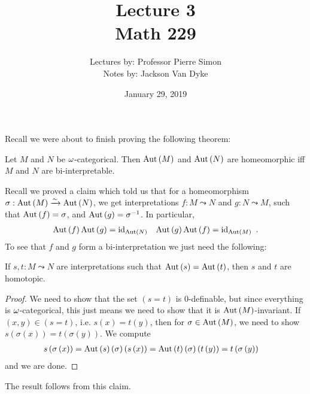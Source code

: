\documentclass{amsart}
\begin{document}
\title{Lecture 3\\Math 229}
\author{Lectures by: Professor Pierre Simon\\Notes by: Jackson Van Dyke}
\date{January 29, 2019}
\maketitle

Recall we were about to finish proving the following theorem:

\begin{thm}
Let $M$ and $N$ be $\omega$-categorical. 
Then $\operatorname{Aut}\left( M \right)$ and $\operatorname{Aut}\left( N \right)$
are homeomorphic iff $M$ and $N$ are bi-interpretable.
\end{thm}

\begin{Proof}
Recall we proved a claim which told us that for a homeomorphism
$\sigma : \operatorname{Aut}\left( M \right)\xrightarrow{\sim}\operatorname{Aut}\left( N \right)$,
we get interpretations $f: M\leadsto N$ and $g:N\leadsto M$,
such that $\operatorname{Aut}\left( f \right) = \sigma$, and $\operatorname{Aut}\left( g \right) = \sigma^{-1}$.
In particular, 
\begin{align}
\Aut\left( f \right) \Aut\left( g \right) = \id_{\Aut\left( N \right)} &&
\Aut\left( g \right) \Aut\left(f \right) = \id_{\Aut\left( M \right)} \ .
\end{align}
To see that $f$ and $g$ form a bi-interpretation we just need the following:
\begin{clm}
If $s,t:M\leadsto N$ are interpretations such that
$\operatorname{Aut}\left( s \right) = \operatorname{Aut}\left( t \right)$, then $s$ and $t$ are homotopic.
\end{clm}
\begin{proof}
We need to show that the set $\left( s=t \right)$ is $0$-definable,
but since everything is $\omega$-categorical,
this just means we need to show that it is $\operatorname{Aut}\left( M \right)$-invariant.
If $\left( x,y \right) \in \left( s=t \right)$, i.e.
$s\left( x \right) = t\left( y \right)$, 
then for $\sigma \in \operatorname{Aut}\left( M \right)$, we need to show 
$s\left( \sigma\left( x \right) \right) = t\left( \sigma\left( y \right) \right)$. 
We compute
\begin{align}
s\left( \sigma\left( x \right) \right) &= \operatorname{Aut}\left( s \right)\left( \sigma \right)
\left( s\left( x \right) \right) 
= \operatorname{Aut}\left( t \right)\left( \sigma \right)\left( t\left( y \right) \right)
= t\left( \sigma\left( y \right) \right)
\end{align}
and we are done.
\end{proof}
The result follows from this claim.
\end{Proof}
\end{document}
